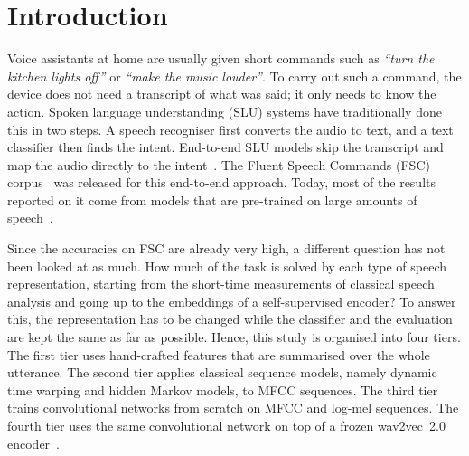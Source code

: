 \documentclass[conference]{IEEEtran}
\begin{document}
\section{Introduction}
Voice assistants at home are usually given short commands such as \emph{``turn the kitchen lights off''} or \emph{``make the music louder''}. To carry out such a command, the device does not need a transcript of what was said; it only needs to know the action. Spoken language understanding (SLU) systems have traditionally done this in two steps. A speech recogniser first converts the audio to text, and a text classifier then finds the intent. End-to-end SLU models skip the transcript and map the audio directly to the intent~\cite{serdyuk2018e2eslu,lugosch2019fsc}. The Fluent Speech Commands (FSC) corpus~\cite{lugosch2019fsc} was released for this end-to-end approach. Today, most of the results reported on it come from models that are pre-trained on large amounts of speech~\cite{lugosch2019fsc,radfar2020transformer,yang2021superb}.

Since the accuracies on FSC are already very high, a different question has not been looked at as much. How much of the task is solved by each type of speech representation, starting from the short-time measurements of classical speech analysis and going up to the embeddings of a self-supervised encoder? To answer this, the representation has to be changed while the classifier and the evaluation are kept the same as far as possible. Hence, this study is organised into four tiers. The first tier uses hand-crafted features that are summarised over the whole utterance. The second tier applies classical sequence models, namely dynamic time warping and hidden Markov models, to MFCC sequences. The third tier trains convolutional networks from scratch on MFCC and log-mel sequences. The fourth tier uses the same convolutional network on top of a frozen wav2vec~2.0 encoder~\cite{baevski2020wav2vec2}.
\end{document}
